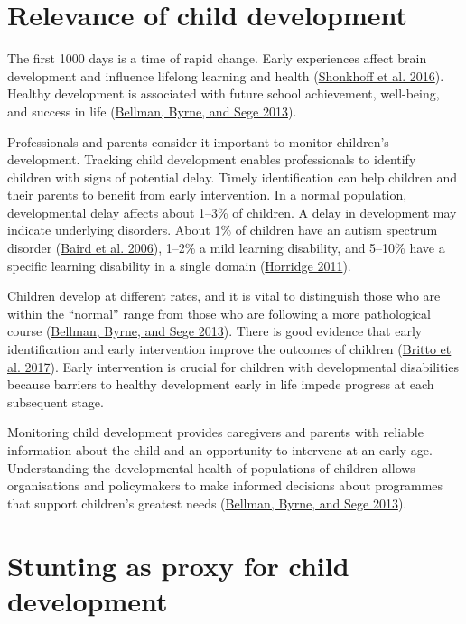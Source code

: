 \documentclass[
]{book}
\begin{document}
\hypertarget{sec:relevance}{%
\section{Relevance of child development}\label{sec:relevance}}

The first 1000 days is a time of rapid change. Early experiences affect brain development and influence lifelong learning and health (\protect\hyperlink{ref-skonkhoff2016best}{Shonkhoff et al. 2016}). Healthy development is associated with future school achievement, well-being, and success in life (\protect\hyperlink{ref-bellman2013}{Bellman, Byrne, and Sege 2013}).

Professionals and parents consider it important to monitor children's development. Tracking child development enables professionals to identify children with signs of potential delay. Timely identification can help children and their parents to benefit from early intervention. In a normal population, developmental delay affects about 1--3\% of children. A delay in development may indicate underlying disorders. About 1\% of children have an autism spectrum disorder (\protect\hyperlink{ref-baird2006}{Baird et al. 2006}), 1--2\% a mild learning disability, and 5--10\% have a specific learning disability in a single domain (\protect\hyperlink{ref-horridge2011}{Horridge 2011}).

Children develop at different rates, and it is vital to distinguish those who are within the ``normal'' range from those who are following a more pathological course (\protect\hyperlink{ref-bellman2013}{Bellman, Byrne, and Sege 2013}). There is good evidence that early identification and early intervention improve the outcomes of children (\protect\hyperlink{ref-britto2017}{Britto et al. 2017}). Early intervention is crucial for children with developmental disabilities because barriers to healthy development early in life impede progress at each subsequent stage.

Monitoring child development provides caregivers and parents with reliable information about the child and an opportunity to intervene at an early age. Understanding the developmental health of populations of children allows organisations and policymakers to make informed decisions about programmes that support children's greatest needs (\protect\hyperlink{ref-bellman2013}{Bellman, Byrne, and Sege 2013}).

\hypertarget{sec:stunting}{%
\section{Stunting as proxy for child development}\label{sec:stunting}}
\end{document}
